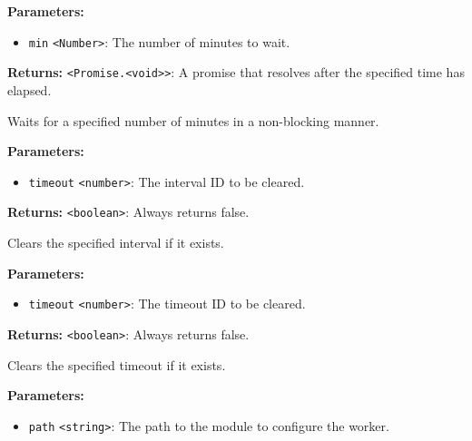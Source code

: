 \documentclass[12pt,a4paper]{article}
\begin{document}
\noindent \textbf{Parameters:}
\begin{itemize}
  \item \texttt{min} \texttt{<Number>}: The number of minutes to wait.
\end{itemize}

\noindent \textbf{Returns:} \texttt{<Promise.<void>>}: A promise that resolves after the specified time has elapsed.

\noindent Waits for a specified number of minutes in a non-blocking manner.

\vspace{5mm}
\noindent {}


\noindent \textbf{Parameters:}
\begin{itemize}
  \item \texttt{timeout} \texttt{<number>}: The interval ID to be cleared.
\end{itemize}

\noindent \textbf{Returns:} \texttt{<boolean>}: Always returns false.

\noindent Clears the specified interval if it exists.

\vspace{5mm}
\noindent {}


\noindent \textbf{Parameters:}
\begin{itemize}
  \item \texttt{timeout} \texttt{<number>}: The timeout ID to be cleared.
\end{itemize}

\noindent \textbf{Returns:} \texttt{<boolean>}: Always returns false.

\noindent Clears the specified timeout if it exists.

\vspace{5mm}
\noindent {}


\noindent \textbf{Parameters:}
\begin{itemize}
  \item \texttt{path} \texttt{<string>}: The path to the module to configure the worker.
\end{itemize}
\end{document}
